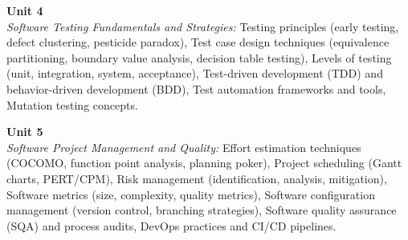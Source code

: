 \noindent\textbf{Unit 4} \\
\textit{Software Testing Fundamentals and Strategies:} Testing principles (early testing, defect clustering, pesticide paradox), Test case design techniques (equivalence partitioning, boundary value analysis, decision table testing), Levels of testing (unit, integration, system, acceptance), Test-driven development (TDD) and behavior-driven development (BDD), Test automation frameworks and tools, Mutation testing concepts.

\vspace{0.3cm}

\noindent\textbf{Unit 5} \\
\textit{Software Project Management and Quality:} Effort estimation techniques (COCOMO, function point analysis, planning poker), Project scheduling (Gantt charts, PERT/CPM), Risk management (identification, analysis, mitigation), Software metrics (size, complexity, quality metrics), Software configuration management (version control, branching strategies), Software quality assurance (SQA) and process audits, DevOps practices and CI/CD pipelines.

\newpage
{}
